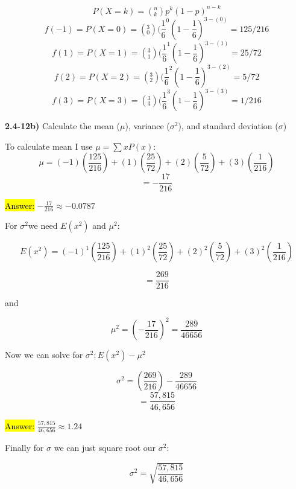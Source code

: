 \documentclass{article}
\begin{document}
\vspace{2mm}



$$P(X=k)=(^{n}_{k})p^{k}(1-p)^{n-k}$$
$$f(-1)=P(X=0)=(^{3}_{0})(\frac{1}{6}^{0}(1-\frac{1}{6})^{3-(0)}=125/216$$
$$f(1)=P(X=1)=(^{3}_{1})(\frac{1}{6}^{1}(1-\frac{1}{6})^{3-(1)}=25/72$$
$$f(2)=P(X=2)=(^{3}_{2})(\frac{1}{6}^{2}(1-\frac{1}{6})^{3-(2)}=5/72$$
$$f(3)=P(X=3)=(^{3}_{3})(\frac{1}{6}^{3}(1-\frac{1}{6})^{3-(3)}=1/216$$

\vspace{3mm}

\textbf{2.4-12b)} Calculate the mean ($\mu$), variance ($\sigma^{2}$), and standard deviation ($\sigma$)

\vspace{2mm}

To calculate mean I use $\mu=\sum xP(x)$:
$$\mu=(-1)(\frac{125}{216})+(1)(\frac{25}{72})+(2)(\frac{5}{72})+(3)(\frac{1}{216})$$
$$=-\frac{17}{216}$$

\vspace{2mm}

\hl{Answer:} $-\frac{17}{216} \approx -0.0787$

\vspace{2mm}

For $\sigma^{2}$we need $E(x^{2})$ and $\mu^{2}$:

$$E(x^2)=(-1)^{1}(\frac{125}{216})+(1)^{2}(\frac{25}{72})+(2)^{2}(\frac{5}{72})+(3)^{2}(\frac{1}{216})$$

$$=\frac{269}{216}$$


\vspace{2mm}

and 

$$\mu^{2}=(-\frac{17}{216})^2=\frac{289}{46656}$$

\newpage

Now we can solve for $\sigma^{2}:E(x^2)-\mu^{2}$

$$\sigma^{2}=(\frac{269}{216})-\frac{289}{46656}$$
$$=\frac{57,815}{46,656}$$

\vspace{2mm}

\hl{Answer:} $\frac{57,815}{46,656} \approx 1.24$

\vspace{2mm}

Finally for $\sigma$ we can just square root our $\sigma^{2}$:

$$\sigma^{2}=\sqrt{\frac{57,815}{46,656}}$$

\vspace{2mm}
\end{document}
